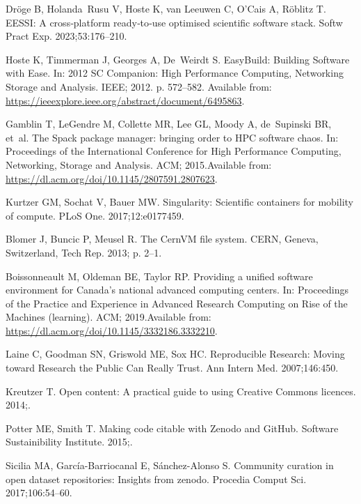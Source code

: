 \documentclass[11pt]{article}
\begin{document}
\begin{thebibliography}{10}
Dröge B, Holanda~Rusu V, Hoste K, van Leeuwen C, O'Cais A, Röblitz T.
\newblock EESSI: A cross‐platform ready‐to‐use optimised scientific
  software stack.
\newblock Softw Pract Exp. 2023;53:176--210.

Hoste K, Timmerman J, Georges A, De~Weirdt S.
\newblock EasyBuild: Building Software with Ease.
\newblock In: 2012 SC Companion: High Performance Computing, Networking Storage
  and Analysis. IEEE; 2012. p. 572--582.
\newblock Available from:
  \url{https://ieeexplore.ieee.org/abstract/document/6495863}.

Gamblin T, LeGendre M, Collette MR, Lee GL, Moody A, de~Supinski BR, et~al.
\newblock The Spack package manager: bringing order to {HPC} software chaos.
\newblock In: Proceedings of the International Conference for High Performance
  Computing, Networking, Storage and Analysis. ACM; 2015.Available from:
  \url{https://dl.acm.org/doi/10.1145/2807591.2807623}.

Kurtzer GM, Sochat V, Bauer MW.
\newblock Singularity: Scientific containers for mobility of compute.
\newblock PLoS One. 2017;12:e0177459.

Blomer J, Buncic P, Meusel R.
\newblock The {CernVM} file system.
\newblock CERN, Geneva, Switzerland, Tech Rep. 2013; p. 2--1.

Boissonneault M, Oldeman BE, Taylor RP.
\newblock Providing a unified software environment for Canada's national
  advanced computing centers.
\newblock In: Proceedings of the Practice and Experience in Advanced Research
  Computing on Rise of the Machines (learning). ACM; 2019.Available from:
  \url{https://dl.acm.org/doi/10.1145/3332186.3332210}.


Laine C, Goodman SN, Griswold ME, Sox HC.
\newblock Reproducible Research: Moving toward Research the Public Can Really
  Trust.
\newblock Ann Intern Med. 2007;146:450.

Kreutzer T.
\newblock Open content: A practical guide to using Creative Commons licences.
  2014;.

Potter ME, Smith T.
\newblock Making code citable with Zenodo and GitHub.
\newblock Software Sustainibility Institute. 2015;.

Sicilia MA, García-Barriocanal E, Sánchez-Alonso S.
\newblock Community curation in open dataset repositories: Insights from
  zenodo.
\newblock Procedia Comput Sci. 2017;106:54--60.


\end{thebibliography}
\end{document}
